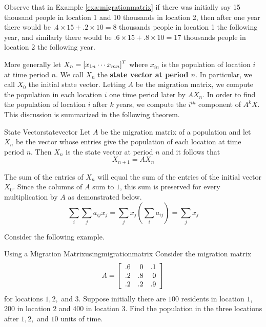 Observe that in Example \ref{exa:migrationmatrix} if there was initially say 15
thousand people in location 1 and 10 thousands in location 2, then
after one year there would be $.4 \times 15 + .2 \times 10 = 8$
thousands people in location 1 the following year, and similarly 
there would be $.6 \times 15 + .8 \times 10 = 17$
thousands people in location 2 the following year.

More generally let $X_n=\left[ x_{1n} \cdots x_{mn}\right] ^{T}$ where $x_{in}$ is the
population of location $i$ at time period $n$. We call $X_n$ the \textbf{state vector at period $n$}. In particular, we call $X_0$ the initial state vector. Letting $A$ be the migration matrix, we compute the population in each location $i$ one time period later by $AX_n$. In order to find the population of location $i$ after $k$
years, we compute the $i^{th}$ component of $A^{k}X.$ This discussion is summarized in the following theorem. 

\begin{theorem}{State Vector}{statevector}
Let $A$ be the migration matrix of a population and let $X_n$ be the vector whose entries give the population of each location at time period $n$. Then $X_n$ is the state vector at period $n$ and it follows that 
\[
X_{n+1} = A X_n
\]
\end{theorem}

The sum of the entries of $X_n$ will equal the sum of the entries of the initial
vector $X_{0}$. Since the columns of $A$ sum to $1$, this sum is preserved for every
multiplication by $A$ as demonstrated below. 
\begin{equation*}
\sum_{i}\sum_{j}a_{ij}x_{j}=\sum_{j}x_{j}\left( \sum_{i}a_{ij}\right)
=\sum_{j}x_{j}
\end{equation*}

Consider the following example.

\begin{example}{Using a Migration Matrix}{usingmigrationmatrix}
Consider the migration matrix 
\begin{equation*}
A = 
\left[
\begin{array}{rrr}
.6 & 0 & .1 \\
.2 & .8 & 0 \\
.2 & .2 & .9
\end{array}
\right] 
\end{equation*}
 for locations $1,2,$ and $3.$ Suppose initially there are $100$
residents in location $1$, $200$ in location $2$ and $400$ in location $3$. Find the
population in the three locations after $1,2,$ and $10$ units of time.
\end{example}


